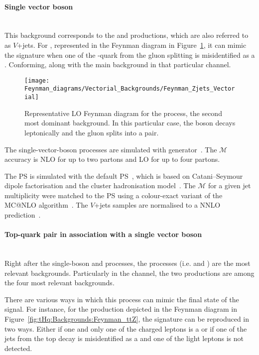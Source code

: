 \paragraph{Single vector boson}\mbox{}\\
This background corresponds to the \Zjets and \Wjets productions, which are also referred
to as \(V\)+jets.
For \Zjets, represented in the Feynman diagram
 in Figure~\ref{fig:tHq:Backgrounds:Feynman_Zjets}, it can mimic the \dilepOStau
 signature when one of the \Pbottom-quark from the gluon splitting is misidentified as
 a \tauhad. Conforming, along with \ttbar the main background in that particular channel.
 
 
 \begin{figure}[h]
\centering
\texttt{[image: Feynman\_diagrams/Vectorial\_Backgrounds/Feynman\_Zjets\_Vectorial]}
\caption{Representative LO Feynman diagram for the \Zjets process, the second most dominant background. In this particular case, the \PZ boson decays leptonically and
the gluon splits into a \bbbar pair.}
\label{fig:tHq:Backgrounds:Feynman_Zjets}
\end{figure}

The single-vector-boson processes are
simulated with \SHERPA[2.2.1] generator~\cite{Bothmann:2019yzt}. 
The $\mathcal{M}$ accuracy is NLO for up to two partons and LO for
up to four partons. 

The PS  is simulated with the default \SHERPA PS~\cite{Schumann:2007mg}, which is based on 
Catani--Seymour dipole factorisation and the cluster hadronisation model~\cite{Winter:2003tt}.
The $\mathcal{M}$ for a given jet multiplicity were matched to the PS using a colour-exact variant 
of the MC@NLO algorithm~\cite{Hoeche:2011fd}.  
The $V$+jets samples are normalised to a NNLO
prediction~\cite{Anastasiou:2003ds}.

\paragraph{Top-quark pair in association with a single vector boson}\mbox{}\\
Right after the single-boson and \ttbar processes, the \ttV processes (i.e. \ttZ and \ttW)
are the most relevant backgrounds. Particularly in the \dilepSStau channel, the two \ttV
productions are among the four most relevant backgrounds. 

There are various ways in which this process can mimic the final state of the signal.
For instance, for the \ttZ production depicted in the Feynman diagram in 
Figure~\ref{fig:tHq:Backgrounds:Feynman_ttZ}, the \dileptau signature can be
reproduced in two ways. Either if one and only one of the charged leptons is a \tauhad or
if one of the jets from the top decay is misidentified as a \tauhad and one of the light leptons
is not detected.


